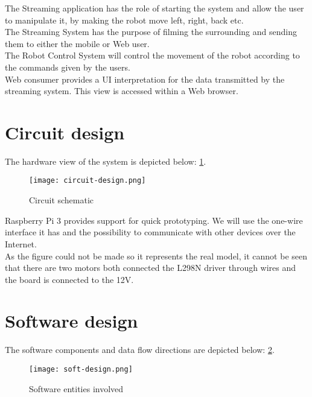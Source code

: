 \documentclass[a4paper,11pt]{article}
\begin{document}
The Streaming application has the role of starting the system and allow the user to manipulate it, by making the robot move left, right, back etc.\\

The Streaming System has the purpose of filming the surrounding and sending them to either the mobile or Web user.\\

The Robot Control System will control the movement of the robot according to the commands given by the users.\\

Web consumer provides a UI interpretation for the data transmitted by the streaming system. This view is accessed within a Web browser.\\


\section{Circuit design}
The hardware view of the system is depicted below: \ref{fig:circuit-design}.

\begin{figure}[h]
\centering
\texttt{[image: circuit-design.png]}
\caption{Circuit schematic}
\label{fig:circuit-design}
\end{figure}

Raspberry Pi 3 provides support for quick prototyping. We will use the one-wire interface it
has and the possibility to communicate with other devices over the Internet. \\

As the figure could not be made so it represents the real model, it cannot be seen that
there are two motors both connected the L298N driver through wires and the board is connected to
the 12V.\\



\section{Software design}
The software components and data flow directions are depicted below: \ref{fig:soft-design}. \\

\begin{figure}[h]
\centering
\texttt{[image: soft-design.png]}
\caption{Software entities involved}
\label{fig:soft-design}
\end{figure}
 
\end{document}
